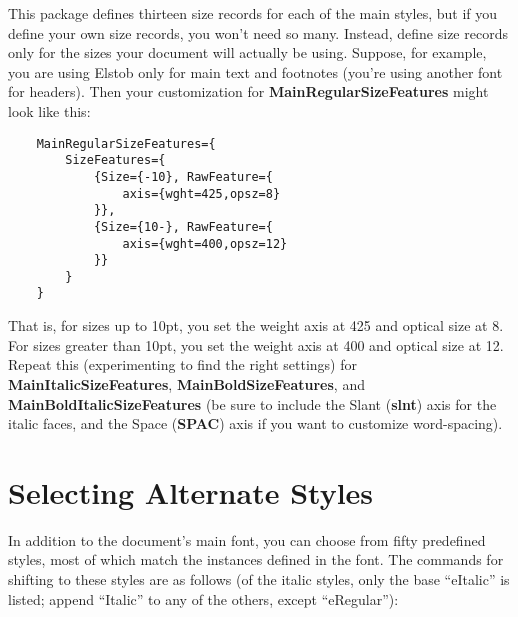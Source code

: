 \documentclass[12pt]{article}
\begin{document}
\noindent This package defines thirteen size records for each of the main styles, but if you
define your own size records, you won't need so many. Instead, define size records only for
the sizes your document will actually be using. Suppose, for example, you are using Elstob
only for main text and footnotes (you're using another font for headers).
Then your customization for \textbf{MainRegularSizeFeatures} might look like this:

\footnotesize
\begin{verbatim}
    MainRegularSizeFeatures={
        SizeFeatures={
            {Size={-10}, RawFeature={
                axis={wght=425,opsz=8}
            }},
            {Size={10-}, RawFeature={
                axis={wght=400,opsz=12}
            }}
        }
    }
\end{verbatim}\normalsize

\noindent That is, for sizes up to 10pt, you set the weight axis at 425 and optical size at 8.
For sizes greater than 10pt, you set the weight axis at 400 and optical size at 12. Repeat 
this (experimenting to find the right settings) for \textbf{MainItalicSizeFeatures},
\textbf{MainBoldSizeFeatures}, and \textbf{MainBoldItalicSizeFeatures} (be sure to include
the Slant (\textbf{slnt}) axis for the italic faces, and the Space (\textbf{SPAC}) axis if you
want to customize word-spacing).

\section{Selecting Alternate Styles}

In addition to the document's main font, you can choose from fifty
predefined styles, most of which match the instances defined in the font.
The commands for shifting to these
styles are as follows (of the italic styles, only the base “eItalic” is listed;
append “Italic” to any of the others, except “eRegular”):
\end{document}
